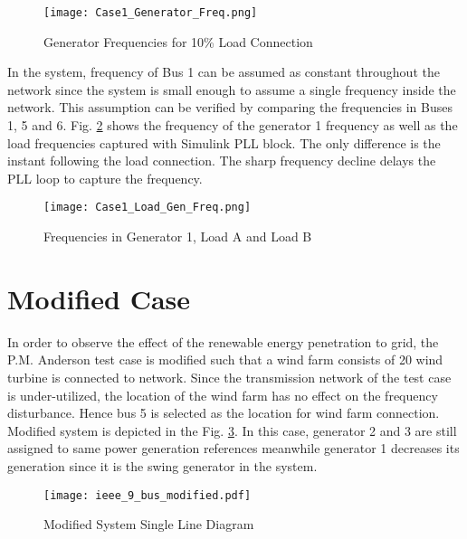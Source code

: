 \begin{figure}[h!]
	\centering
	\texttt{[image: Case1\_Generator\_Freq.png]}
	\caption{Generator Frequencies for 10\% Load Connection}
	\label{genfreqcase1}
\end{figure}
In the system, frequency of Bus 1 can be assumed as constant throughout the network since the system is small enough to assume a single frequency inside the network. This assumption can be verified by comparing the frequencies in Buses 1, 5 and 6. Fig. \ref{genfreqcase1_loadgen} shows the frequency of the generator 1 frequency as well as the load frequencies captured with Simulink PLL block. The only difference is the instant following the load connection. The sharp frequency decline delays the PLL loop to capture the frequency. 
\begin{figure}[h!]
	\centering
	\texttt{[image: Case1\_Load\_Gen\_Freq.png]}
	\caption{Frequencies in Generator 1, Load A and Load B}
	\label{genfreqcase1_loadgen}
\end{figure}
\section{Modified Case}
\label{sec:kmodified}
In order to observe the effect of the renewable energy penetration to grid, the P.M. Anderson test case is modified such that a wind farm consists of 20 wind turbine is connected to network. Since the transmission network of the test case is under-utilized, the location of the wind farm has no effect on the frequency disturbance. Hence bus 5 is selected as the location for wind farm connection. Modified system is depicted in the Fig. \ref{ieee_9_bus_case2}. In this case, generator 2 and 3 are still assigned to same power generation references meanwhile generator 1 decreases its generation since it is the swing generator in the system. 
\begin{figure}[h!]
	\centering
	\texttt{[image: ieee\_9\_bus\_modified.pdf]}
	\caption{Modified System Single Line Diagram}
	\label{ieee_9_bus_case2}
\end{figure}
